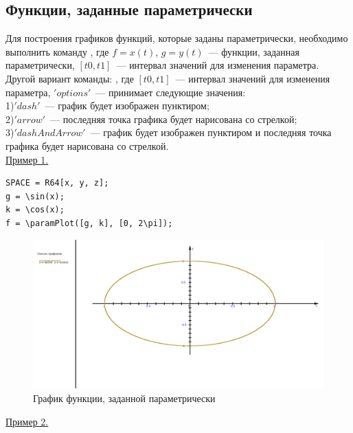 \subsection{Функции, заданные параметрически}
Для построения графиков функций, которые заданы параметрически,  необходимо выполнить команду 
, 
где $f = x(t)$, $g = y(t)$~--- функции,  заданная параметрически, 
$[t0, t1]$~--- интервал значений для изменения параметра. 
Другой вариант команды: , где $[t0, t1]$~--- интервал значений для изменения параметра, 
$'options'$~--- принимает следующие значения:\\
1)$'dash'$~--- график будет изображен пунктиром;\\ 
2)$'arrow'$~---  последняя точка графика будет нарисована со стрелкой;\\
3)$'dashAndArrow'$~--- график будет изображен пунктиром и последняя точка графика будет нарисована со стрелкой.\\


\underline{Пример 1. }


\nopagebreak
\vspace*{-2mm}
\begin{verbatim}
SPACE = R64[x, y, z];
g = \sin(x); 
k = \cos(x); 
f = \paramPlot([g, k], [0, 2\pi]);
\end{verbatim}
\vspace*{-2mm}

\begin{figure}[h!]
 \includegraphics[scale=0.26]{pictures/2_1}
\vspace*{-10mm}
\caption{График функции, заданной параметрически}
\label{3_4}
\end{figure}


\eject
\underline{Пример 2. }


